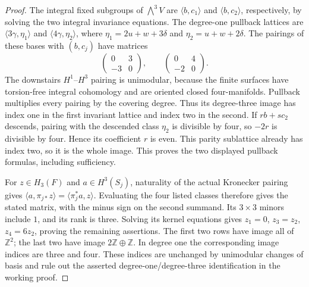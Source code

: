 \begin{proof}
The integral fixed subgroups of $\bigwedge^3 V$ are
$\langle b,c_1\rangle$ and $\langle b,c_2\rangle$, respectively, by
solving the two integral invariance equations. The degree-one pullback
lattices are $\langle3\gamma,\eta_1\rangle$ and
$\langle4\gamma,\eta_2\rangle$, where
$\eta_1=2u+w+3\delta$ and $\eta_2=u+w+2\delta$.
The pairings of these bases with $(b,c_j)$ have matrices
\[
 \begin{pmatrix}0&3\\-3&0\end{pmatrix},\qquad
 \begin{pmatrix}0&4\\-2&0\end{pmatrix}.
\]
The downstairs $H^1$--$H^3$ pairing is unimodular, because the finite
surfaces have torsion-free integral cohomology and are oriented closed
four-manifolds. Pullback multiplies every pairing by the covering degree.
Thus its degree-three image has index one in the first invariant lattice
and index two in the second. If $rb+sc_2$ descends, pairing with the
descended class $\eta_2$ is divisible by four, so $-2r$ is divisible by
four. Hence its coefficient $r$ is even. This parity sublattice already
has index two, so it is the whole image. This proves the two displayed
pullback formulas, including sufficiency.

For $z\in H_3(F)$ and $a\in H^3(S_j)$, naturality of the actual
Kronecker pairing gives $\langle a,\pi_{j*}z\rangle
=\langle\pi_j^*a,z\rangle$. Evaluating the four listed classes therefore
gives the stated matrix, with the minus sign on the second summand.
Its $3\times3$ minors include $1$, and its rank is three. Solving its
kernel equations gives $z_1=0$, $z_3=z_2$, $z_4=6z_2$, proving the
remaining assertions. The first two rows have image all of $\mathbb Z^2$;
the last two have image $2\mathbb Z\oplus\mathbb Z$. In degree one the
corresponding image indices are three and four. These indices are
unchanged by unimodular changes of basis and rule out the asserted
degree-one/degree-three identification in the working proof.
\end{proof}
